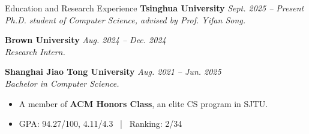 \documentclass{resume} %
\begin{document}

\begin{rSection}{Education and Research Experience}
{\bf Tsinghua University} \hfill {\em Sept. 2025 -- Present}
\\ \emph{Ph.D. student of Computer Science, advised by Prof. Yifan Song.}

{\bf Brown University} \hfill {\em Aug. 2024 -- Dec. 2024}
\\ \emph{Research Intern.}

{\bf Shanghai Jiao Tong University} \hfill {\em Aug. 2021 -- Jun. 2025} 
\\ \emph{Bachelor in Computer Science.}
\vspace{-0.6em}
\begin{itemize}[nosep, leftmargin=*]
  \item A member of {\bf ACM Honors Class}, an elite CS program in SJTU.
  \item GPA: 94.27/100, 4.11/4.3 ~|~ Ranking: 2/34
\end{itemize}


\end{rSection}
\end{document}
